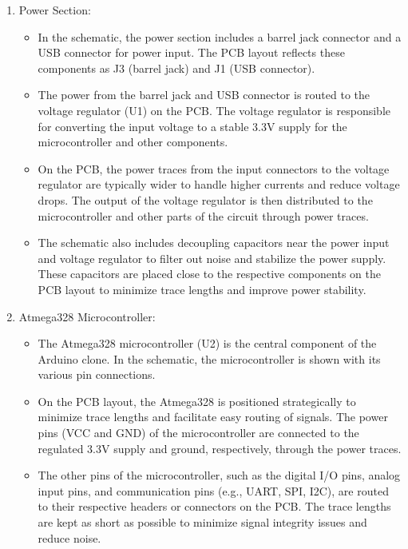 \documentclass[a4paper,11pt]{article}%
\begin{document}
\begin{enumerate}
	\item Power Section:
	      \begin{itemize}
		      \item In the schematic, the power section includes a barrel jack connector and a USB connector for power input. The PCB layout reflects these components as J3 (barrel jack) and J1 (USB connector).
		      \item The power from the barrel jack and USB connector is routed to the voltage regulator (U1) on the PCB. The voltage regulator is responsible for converting the input voltage to a stable 3.3V supply for the microcontroller and other components.
		      \item On the PCB, the power traces from the input connectors to the voltage regulator are typically wider to handle higher currents and reduce voltage drops. The output of the voltage regulator is then distributed to the microcontroller and other parts of the circuit through power traces.
		      \item The schematic also includes decoupling capacitors near the power input and voltage regulator to filter out noise and stabilize the power supply. These capacitors are placed close to the respective components on the PCB layout to minimize trace lengths and improve power stability.
	      \end{itemize}



	\item Atmega328 Microcontroller:
	      \begin{itemize}
		      \item The Atmega328 microcontroller (U2) is the central component of the Arduino clone. In the schematic, the microcontroller is shown with its various pin connections.

		      \item On the PCB layout, the Atmega328 is positioned strategically to minimize trace lengths and facilitate easy routing of signals. The power pins (VCC and GND) of the microcontroller are connected to the regulated 3.3V supply and ground, respectively, through the power traces.

		      \item The other pins of the microcontroller, such as the digital I/O pins, analog input pins, and communication pins (e.g., UART, SPI, I2C), are routed to their respective headers or connectors on the PCB. The trace lengths are kept as short as possible to minimize signal integrity issues and reduce noise.


\end{itemize}
\end{enumerate}
\end{document}
